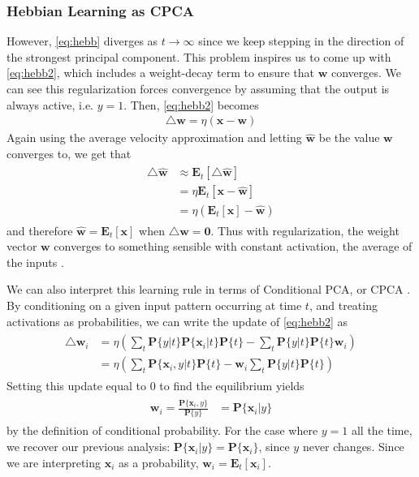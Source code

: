 \documentclass[12pt, usenames]{article}
\theoremstyle{definition}
\theoremstyle{definition}
\theoremstyle{definition}
\newcommand{\prob}[1]
{\textbf{P}\{{#1}\}}
\newcommand{\E}[2]
{\textbf{E}_{#1}\left[{#2}\right]}
\newcommand{\vv}[1]
{\textbf{#1}}
\begin{document}
\subsubsection{Hebbian Learning as CPCA}
However, \autoref{eq:hebb} diverges as $t \to \infty$ since we keep stepping in the direction of the strongest principal component. This problem inspires us to come up with \autoref{eq:hebb2}, which includes a weight-decay term to ensure that $\vv{w}$ converges. We can see this regularization forces convergence by assuming that the output is always active, i.e. $y = 1$. Then, \autoref{eq:hebb2} becomes 
\begin{align}
\triangle \vv{w} = \eta \left(\vv{x} - \vv{w}\right)
\end{align}
Again using the average velocity approximation and letting $\hat{\vv{w}}$ be the value $\vv{w}$ converges to, we get that 
\begin{align}
\begin{split}
\triangle \hat{\vv{w}} &\approx \E{t}{\triangle \hat{\vv{w}}}
\\
&= \eta\E{t}{\vv{x} - \hat{\vv{w}}}
\\
&= \eta\left(\E{t}{\vv{x}} - \hat{\vv{w}}\right)
\end{split}
\end{align}
and therefore $\hat{\vv{w}} = \E{t}{\vv{x}}$ when $\triangle \hat{\vv{w}} = \vv{0}$. Thus with regularization, the weight vector $\vv{w}$ converges to something sensible with constant activation, the average of the inputs \cite{Seung}. 

We can also interpret this learning rule in terms of Conditional PCA, or CPCA \cite{OReilly}. 
By conditioning on a given input pattern occurring at time $t$, and treating activations as probabilities, we can write the update of \autoref{eq:hebb2} as 
\begin{align}
\begin{split}
\triangle \vv{w}_i &= \eta\left(\sum_t \prob{y|t}\prob{\vv{x}_i|t}\prob{t} - \sum_t \prob{y|t}\prob{t}\vv{w}_i\right)
\\
&= \eta\left(\sum_t \prob{\vv{x}_i, y|t}\prob{t} - \vv{w}_i\sum_t\prob{y|t}\prob{t}\right)
\end{split}
\end{align}
Setting this update equal to $0$ to find the equilibrium yields 
\begin{align}
\begin{split}
\vv{w}_i = \frac{\prob{\vv{x}_i, y}}{\prob{y}} &= \prob{\vv{x}_i | y}
\end{split}
\end{align}
by the definition of conditional probability. For the case where $y = 1$ all the time, we recover our previous analysis: $\prob{\vv{x}_i|y} = \prob{\vv{x}_i}$, since $y$ never changes. Since we are interpreting $\vv{x}_i$ as a probability, $\vv{w}_i = \E{t}{\vv{x}_i}$. 
\end{document}
